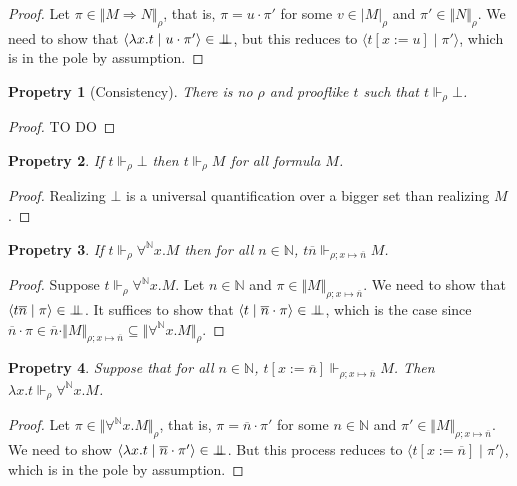 \documentclass{article}
\newcommand{\N}{\mathbb{N}}
\newcommand{\proc}[2]{\langle{#1}\mid{#2}\rangle}
\newcommand{\depforall}[1]{\forall^\N #1.}
\newcommand{\pole}{{\bot\mkern-10mu\bot}}
\newcommand{\realizes}{\Vdash}
\newcommand{\terminterp}[2]{\Vert #1 \Vert_{#2}}
\newcommand{\truthinterp}[2]{\vert #1 \vert_{#2}}
\newtheorem{property}{Propetry}
\begin{document}
\begin{proof}
    Let $\pi \in \terminterp{M \Rightarrow N}{\rho}$, that is, $\pi = u \cdot \pi'$ for some $v \in \truthinterp{M}{\rho}$ and $\pi' \in \terminterp{N}{\rho}$.
    We need to show that $\proc{\lambda x. t}{u \cdot \pi'} \in \pole$, but this reduces to $\proc{t[x := u]}{\pi'}$, which is in the pole by assumption.
\end{proof}

\begin{property}[Consistency]
    There is no $\rho$ and prooflike $t$ such that $t \realizes_\rho \bot$.
\end{property}

\begin{proof}
    TO DO
\end{proof}

\begin{property}\label{reabot}
    If $t \realizes_\rho \bot$ then $t \realizes_\rho M$ for all formula $M$.
\end{property}

\begin{proof}
    Realizing $\bot$ is a universal quantification over a bigger set than realizing $M$.
\end{proof}

\begin{property}\label{depforallelim}
    If $t \realizes_\rho \depforall{x} M$ then for all $n \in \N$, $t \overline{n} \realizes_{\rho; x \mapsto \overline{n}} M$.
\end{property}

\begin{proof}
    Suppose $t \realizes_\rho \depforall{x} M$.
    Let $n \in \N$ and $\pi \in \terminterp{M}{\rho; x \mapsto \overline{n}}$.
    We need to show that $\proc{t \overline{n}}{\pi} \in \pole$.
    It suffices to show that $\proc{t}{\overline{n}\cdot\pi} \in \pole$, which is the case since $\overline{n} \cdot \pi \in \overline{n} \cdot \terminterp{M}{\rho; x \mapsto \overline{n}} \subseteq \terminterp{\depforall{x} M}{\rho}$.
\end{proof}

\begin{property}\label{depforallintro}
    Suppose that for all $n \in \N$, $t[x := \overline{n}] \realizes_{\rho; x \mapsto \overline{n}} M$.
    Then $\lambda x. t \realizes_\rho \depforall{x} M$.
\end{property}

\begin{proof}
    Let $\pi \in \terminterp{\depforall{x} M}{\rho}$, that is, $\pi = \overline{n} \cdot \pi'$ for some $n \in \N$ and $\pi' \in \terminterp{M}{\rho; x \mapsto \overline{n}}$.
    We need to show $\proc{\lambda x. t}{\overline{n} \cdot \pi'} \in \pole$.
    But this process reduces to $\proc{t[x := \overline{n}]}{\pi'}$, which is in the pole by assumption.
\end{proof}
\end{document}
